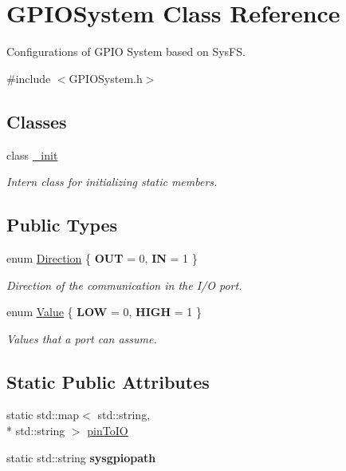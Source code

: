 \hypertarget{classGPIOSystem}{\section{G\-P\-I\-O\-System Class Reference}
\label{classGPIOSystem}
}


Configurations of G\-P\-I\-O System based on Sys\-F\-S.  




{\ttfamily \#include $<$G\-P\-I\-O\-System.\-h$>$}

\subsection*{Classes}
\begin{DoxyCompactItemize}
\item 
class \hyperlink{classGPIOSystem_1_1__init}{\-\_\-init}
\begin{DoxyCompactList}\small\item\em Intern class for initializing static members. \end{DoxyCompactList}\end{DoxyCompactItemize}
\subsection*{Public Types}
\begin{DoxyCompactItemize}
\item 
enum \hyperlink{classGPIOSystem_ab7ef139a50e1e552a75578b539c7c34d}{Direction} \{ {\bfseries O\-U\-T} = 0, 
{\bfseries I\-N} = 1
 \}
\begin{DoxyCompactList}\small\item\em Direction of the communication in the I/\-O port. \end{DoxyCompactList}\item 
enum \hyperlink{classGPIOSystem_ace7a93165949f378a8ab04f8809e52f1}{Value} \{ {\bfseries L\-O\-W} = 0, 
{\bfseries H\-I\-G\-H} = 1
 \}
\begin{DoxyCompactList}\small\item\em Values that a port can assume. \end{DoxyCompactList}\end{DoxyCompactItemize}
\subsection*{Static Public Attributes}
\begin{DoxyCompactItemize}
\item 
static std\-::map$<$ std\-::string, \\*
std\-::string $>$ \hyperlink{classGPIOSystem_ad94aecb41bf4030d30402bd425eaa16a}{pin\-To\-I\-O}
\item 
\hypertarget{classGPIOSystem_a97966b506b11bb23406e33a996ac09bb}{static std\-::string {\bfseries sysgpiopath}}\label{classGPIOSystem_a97966b506b11bb23406e33a996ac09bb}

\end{DoxyCompactItemize}
